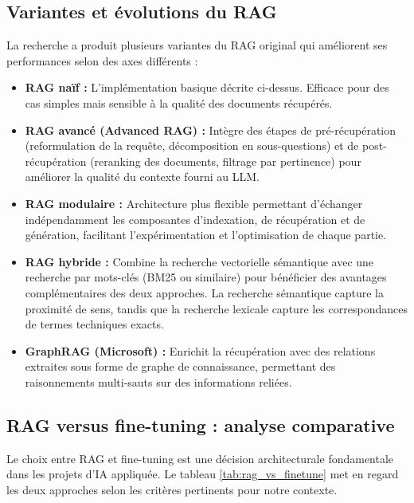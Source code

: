 \subsection{Variantes et évolutions du RAG}

La recherche a produit plusieurs variantes du RAG original qui améliorent ses performances selon des axes différents \cite{logo:advanced_rag} :

\begin{itemize}
    \item \textbf{RAG naïf :} L'implémentation basique décrite ci-dessus. Efficace pour des cas simples mais sensible à la qualité des documents récupérés.

    \item \textbf{RAG avancé (Advanced RAG) :} Intègre des étapes de pré-récupération (reformulation de la requête, décomposition en sous-questions) et de post-récupération (reranking des documents, filtrage par pertinence) pour améliorer la qualité du contexte fourni au LLM.

    \item \textbf{RAG modulaire :} Architecture plus flexible permettant d'échanger indépendamment les composantes d'indexation, de récupération et de génération, facilitant l'expérimentation et l'optimisation de chaque partie.

    \item \textbf{RAG hybride :} Combine la recherche vectorielle sémantique avec une recherche par mots-clés (BM25 ou similaire) pour bénéficier des avantages complémentaires des deux approches. La recherche sémantique capture la proximité de sens, tandis que la recherche lexicale capture les correspondances de termes techniques exacts.

    \item \textbf{GraphRAG (Microsoft) \cite{logo:graphrag} :} Enrichit la récupération avec des relations extraites sous forme de graphe de connaissance, permettant des raisonnements multi-sauts sur des informations reliées.
\end{itemize}

\subsection{RAG versus fine-tuning : analyse comparative}

Le choix entre RAG et fine-tuning est une décision architecturale fondamentale dans les projets d'IA appliquée. Le tableau \ref{tab:rag_vs_finetune} met en regard les deux approches selon les critères pertinents pour notre contexte.

